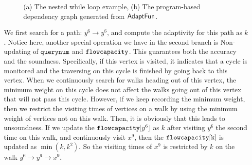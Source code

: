 \begin{figure}
{\begin{subfigure}{.3\textwidth}
\begin{centering}
    \caption{}
       \end{centering}
       \end{subfigure}
     }
     \vspace{-0.4cm}
      \caption{(a) The nested while loop example, (b) The program-based dependency graph generated from $\textsf{AdaptFun}$.}
     \label{fig:alg_adaptsearch_nestedwhile}
     \vspace{-0.7cm}
     \end{figure}
     We first search for a path: $y^6 \to y^6$, and compute the adaptivity for this path as 
     $k$.
     Notice here, another special operation we have in the second branch is Non-updating of
 $\mathtt{querynum}$ and $\mathtt{flowcapacity}$.
 This guarantees both the accuracy and the soundness.
 Specifically,
 if this vertex is visited, it indicates that a cycle is monitored and  
 the traversing on this cycle is finished by going back to this vertex.
 When we continuously search for walks heading out of this vertex, 
 the minimum weight on this cycle does not affect the walks going out of this vertex that will not pass this cycle.
 However, if we keep recording the minimum weight, then we
 restrict the visiting times of vertices on a walk by
  using the minimum weight of vertices not on this walk.
 Then, it is obviously that this leads to unsoundness.
   If we update the $\mathtt{flowcapacity}[y^6]$ as $k$ after visiting $y^6$ the second time 
   on this walk,
   and continuously visit $x^9$,
   then the $\mathtt{flowcapacity[k]}$ is 
   updated as $\min(k, k^2)$.
   So
   the visiting times of $x^9$ is restricted by $k$ on the walk $y^6 \to y^6 \to x^9$.
